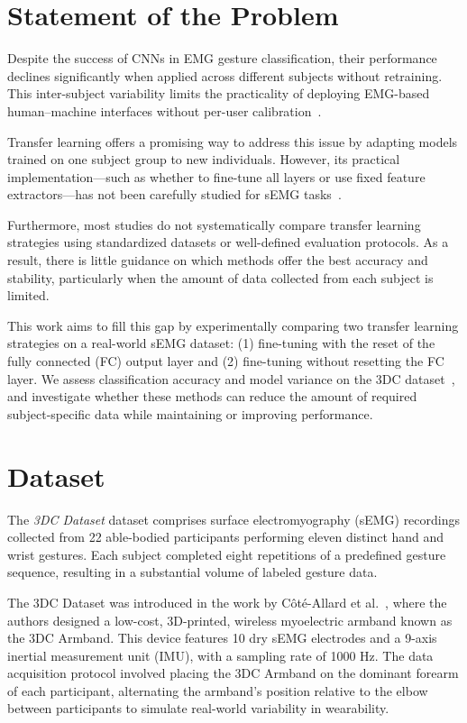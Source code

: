 \section{Statement of the Problem}

Despite the success of CNNs in EMG gesture classification, their performance declines significantly when applied across different subjects without retraining. This inter-subject variability limits the practicality of deploying EMG-based human–machine interfaces without per-user calibration~\cite{Cote2019, Geng2016}.

Transfer learning offers a promising way to address this issue by adapting models trained on one subject group to new individuals. However, its practical implementation—such as whether to fine-tune all layers or use fixed feature extractors—has not been carefully studied for sEMG tasks~\cite{Lehmler2021}.

Furthermore, most studies do not systematically compare transfer learning strategies using standardized datasets or well-defined evaluation protocols. As a result, there is little guidance on which methods offer the best accuracy and stability, particularly when the amount of data collected from each subject is limited.

This work aims to fill this gap by experimentally comparing two transfer learning strategies on a real-world sEMG dataset: (1) fine-tuning with the reset of the fully connected (FC) output layer and (2) fine-tuning without resetting the FC layer. We assess classification accuracy and model variance on the 3DC dataset~\cite{Cote2019_3DC}, and investigate whether these methods can reduce the amount of required subject-specific data while maintaining or improving performance.

\section{Dataset}

The \textit{3DC Dataset} dataset comprises surface electromyography (sEMG) recordings collected from 22 able-bodied participants performing eleven distinct hand and wrist gestures. Each subject completed eight repetitions of a predefined gesture sequence, resulting in a substantial volume of labeled gesture data.

The 3DC Dataset was introduced in the work by Côté-Allard et al.~\cite{Cote2019_3DC}, where the authors designed a low-cost, 3D-printed, wireless myoelectric armband known as the 3DC Armband. This device features 10 dry sEMG electrodes and a 9-axis inertial measurement unit (IMU), with a sampling rate of 1000 Hz. The data acquisition protocol involved placing the 3DC Armband on the dominant forearm of each participant, alternating the armband's position relative to the elbow between participants to simulate real-world variability in wearability.

